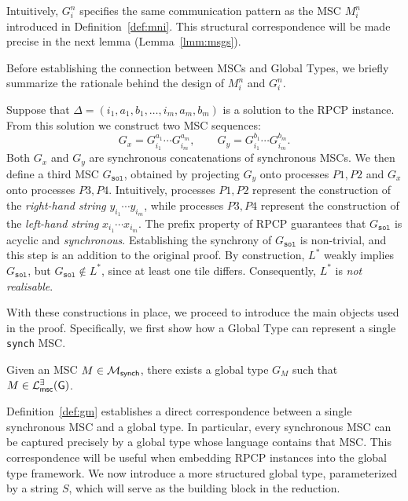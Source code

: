 Intuitively, $G_i^n$ specifies the same communication pattern as the MSC  
$M^n_i$ introduced in Definition~\ref{def:mni}. This structural  
correspondence will be made precise in the next lemma (Lemma~\ref{lmm:msgs}).  

Before establishing the connection between MSCs and Global Types,
we briefly summarize the rationale behind the design of $M_i^n$ and $G_i^n$.

Suppose that $\Delta=(i_1,a_1,b_1,\ldots,i_m,a_m,b_m)$ is a  
solution to the RPCP instance. From this solution we construct two MSC  
sequences:
\[
G_x = G^{a_1}_{i_1}\cdots G^{a_m}_{i_m}, \qquad  
G_y = G^{b_1}_{i_1}\cdots G^{b_m}_{i_m}.
\]
Both $G_x$ and $G_y$ are synchronous concatenations of synchronous  
MSCs. We then define a third MSC $G_{\texttt{sol}}$, obtained by  
projecting $G_y$ onto processes $P1,P2$ and $G_x$ onto processes  
$P3,P4$. Intuitively, processes $P1,P2$ represent the construction of  
the \emph{right-hand string} $y_{i_1}\cdots y_{i_m}$, while processes  
$P3,P4$ represent the construction of the \emph{left-hand string}  
$x_{i_1}\cdots x_{i_m}$. The prefix property of RPCP guarantees that  
$G_{\texttt{sol}}$ is acyclic and \emph{synchronous}. Establishing the  
synchrony of $G_{\texttt{sol}}$ is non-trivial, and this step is an  
addition to the original proof. By construction, $L^*$ weakly implies  
$G_{\texttt{sol}}$, but $G_{\texttt{sol}} \notin L^*$, since at least  
one tile differs. Consequently, $L^*$ is \emph{not realisable}.
  
With these constructions in place, we proceed to introduce the main  
objects used in the proof. Specifically, we first show how a Global  
Type can represent a single \verb|synch| MSC.

\bigskip

\begin{definition}[$G_M$]\label{def:gm}
	Given an MSC $M\in \mathcal{M}_{\mathsf{synch}}$, there exists a
	global type $G_M$ such that $M \in \mathcal{L}_{\mathsf{msc}}^{\exists}(\mathsf{G})$.
\end{definition}

Definition~\ref{def:gm} establishes a direct correspondence between a  
single synchronous MSC and a global type. In particular, every  
synchronous MSC can be captured precisely by a global type whose  
language contains that MSC. This correspondence will be useful  
when embedding RPCP instances into the global type framework.
We now introduce a more structured global type, parameterized by a  
string $S$, which will serve as the building block in the reduction.

